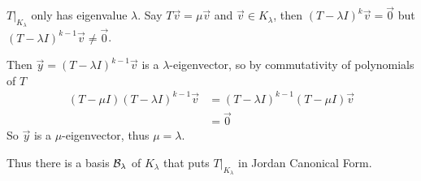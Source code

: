 \begin{remark}
  $T\big\rvert_{K_\lambda}$ only has eigenvalue $\lambda$.
  Say $T\vec v = \mu \vec v$ and $\vec v \in K_\lambda$, then $(T-\lambda I)^k \vec v = \vec 0$
  but $(T-\lambda I)^{k-1}\vec v \ne \vec 0$.

  Then $\vec y = (T-\lambda I)^{k-1}\vec v$ is a $\lambda$-eigenvector, so by commutativity of polynomials of $T$
  \begin{align}
    (T-\mu I)(T - \lambda I)^{k-1} \vec v 
      &= (T-\lambda I)^{k-1}(T-\mu I)\vec v \\
      &= \vec 0
  \end{align}
  So $\vec y$ is a $\mu$-eigenvector, thus $\mu = \lambda$.

  Thus there is a basis $\mathcal{B}_\lambda$ of $K_\lambda$ that puts $T\big\rvert_{K_\lambda}$ in Jordan Canonical Form.
\end{remark}

